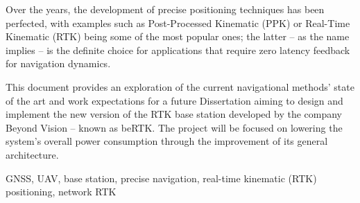Over the years, the development of precise positioning techniques has been perfected, with examples such as Post-Processed Kinematic (PPK) or Real-Time Kinematic (RTK) being some of the most popular ones; the latter -- as the name implies -- is the definite choice for applications that require zero latency feedback for navigation dynamics.

This document provides an exploration of the current navigational methods' state of the art and work expectations for a future Dissertation aiming to design and implement the new version of the RTK base station developed by the company Beyond Vision -- known as beRTK\textsuperscript{\textregistered}. The project will be focused on lowering the system's overall power consumption through the improvement of its general architecture.

\begin{keywords}
  GNSS, UAV, base station, precise navigation, real-time kinematic (RTK) positioning, network RTK 
\end{keywords} 
